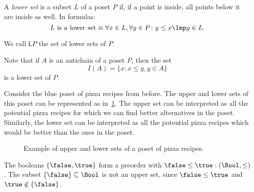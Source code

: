 \begin{definition}
\label{def:lowerset}
A \emph{lower set} is a subset $L$ of a poset $P$ if, if a point is inside, all points below it are inside as well. In formulas:
\begin{equation}
\text{$L$ is a lower set} \equiv \forall x\in L, \forall y\in P\colon y\leq x \Imp y\in L.
\end{equation}
\end{definition}
\begin{remark}
We call $\mathsf{L}P$ the set of lower sets of $P$.
\end{remark}

\begin{remark}
Note that if $A$ is an antichain of a poset $P$, then the set
\begin{equation}
    I(A)=\{x\colon x\leq y, y\in A\}
\end{equation}
is a lower set of $P$.
\end{remark}



Consider the blue poset of pizza recipes from before. The upper and lower sets of this poset can be represented as in~\cref{fig:upperset}. The upper set can be interpreted as all the potential pizza recipes for which we can find better alternatives in the poset. Similarly, the lower set can be interpreted as all the potential pizza recipes which would be better than the ones in the poset.

\begin{figure}[h!]
\begin{center}
\end{center}
\caption{Example of upper and lower sets of a poset of pizza recipes. \label{fig:upperset}}
\end{figure}
\begin{example}
The booleans $\{\false, \true \}$ form a preorder with $\false \leq \true:(\Bool,\leq)$ . The subset $\{\false\} \subseteq \Bool$ is not an upper set, since $\false \leq \true$ and $\true \notin \{\false \}$.	
\end{example}

